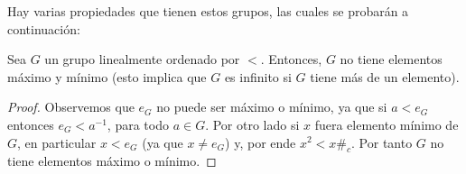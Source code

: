 \documentclass[12pt]{report}
\theoremstyle{largebreak}
\newcommand{\contradiction}{\ensuremath{\#_c}}
\begin{document}
    Hay varias propiedades que tienen estos grupos, las cuales se probarán a continuación:

    \begin{propo}
        Sea $G$ un grupo linealmente ordenado por $<$. Entonces,
        $G$ no tiene elementos máximo y mínimo (esto implica que $G$ es infinito si $G$ tiene más de un elemento).
    \end{propo}

    \begin{proof}
        Observemos que $e_G$ no puede ser máximo o mínimo, ya que si $a<e_G$ entonces $e_G<a^{-1}$, para todo $a\in G$. Por otro lado si $x$ fuera elemento mínimo de $G$, en particular $x<e_G$ (ya que $x\neq e_G$) y, por ende $x^2<x$\contradiction. Por tanto $G$ no tiene elementos máximo o mínimo.
    \end{proof}
\end{document}

